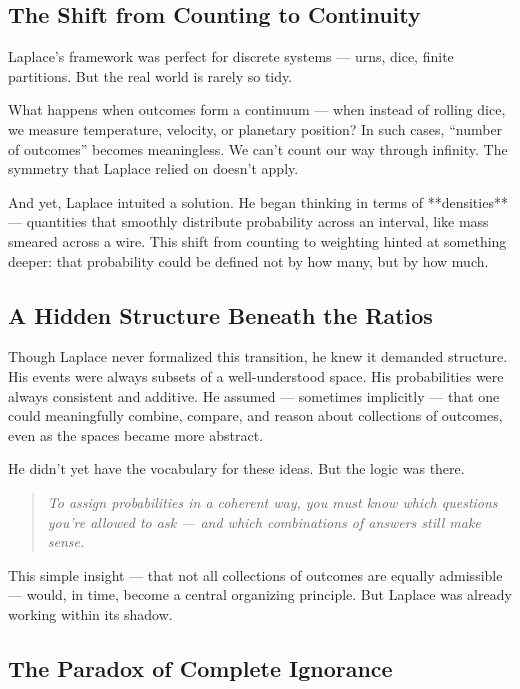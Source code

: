 \subsection{The Shift from Counting to Continuity}

Laplace’s framework was perfect for discrete systems — urns, dice, finite partitions. But the real world is rarely so tidy.

What happens when outcomes form a continuum — when instead of rolling dice, we measure temperature, velocity, or planetary position? In such cases, “number of outcomes” becomes meaningless. We can’t count our way through infinity. The symmetry that Laplace relied on doesn’t apply.

And yet, Laplace intuited a solution. He began thinking in terms of **densities** — quantities that smoothly distribute probability across an interval, like mass smeared across a wire. This shift from counting to weighting hinted at something deeper: that probability could be defined not by how many, but by how much.

\subsection{A Hidden Structure Beneath the Ratios}

Though Laplace never formalized this transition, he knew it demanded structure. His events were always subsets of a well-understood space. His probabilities were always consistent and additive. He assumed — sometimes implicitly — that one could meaningfully combine, compare, and reason about collections of outcomes, even as the spaces became more abstract.

He didn’t yet have the vocabulary for these ideas. But the logic was there.

\begin{quote}
    \textit{To assign probabilities in a coherent way, you must know which questions you’re allowed to ask — and which combinations of answers still make sense.}
\end{quote}

This simple insight — that not all collections of outcomes are equally admissible — would, in time, become a central organizing principle. But Laplace was already working within its shadow.

\subsection{The Paradox of Complete Ignorance}

